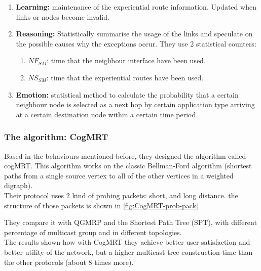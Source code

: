 \begin{enumerate}
\item \textbf{Learning:} maintenance of the experiential route information. Updated when links or nodes become invalid.

\item \textbf{Reasoning:} Statistically summarise the usage of the links and speculate on the possible causes why the exceptions occur. They use 2 statistical counters:
	\begin{enumerate}
	\item $NF_{SM}$: time that the neighbour interface have been used.
	\item $NS_{SM}$: time that the experiential routes have been used.
	\end{enumerate}

\item \textbf{Emotion:} statistical method to calculate the probability that a certain neighbour node is selected as a next hop by certain application type arriving at a certain destination node within a certain time period.
\end{enumerate}

\subsubsection{The algorithm: CogMRT}

Based in the behaviours mentioned before, they designed the algorithm called cogMRT. This algorithm works on the classic Bellman-Ford algorithm (shortest paths from a single source vertex to all of the other vertices in a weighted digraph).\\

Their protocol uses 2 kind of probing packets: short, and long distance. the structure of those packets is shown in \ref{fig:CogMRT-prob-pack}\\ 


They compare it with QGMRP \cite{QGMRP} and the Shortest Path Tree (SPT), with different percentage of multicast group and in different topologies.\\

The results shown how with CogMRT they achieve better user satisfaction and better utility of the network, but a higher multicast tree construction time than the other protocols (about 8 times more).\\


